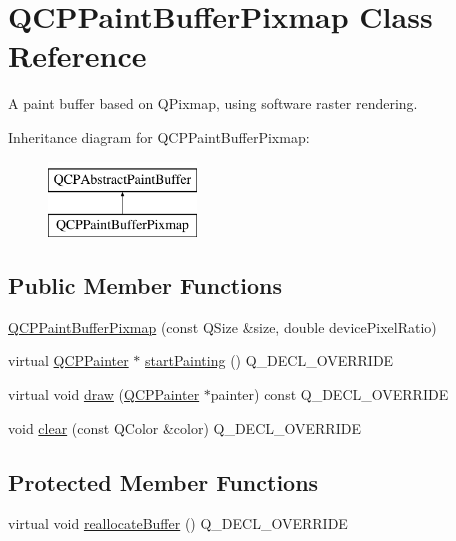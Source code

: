 \hypertarget{class_q_c_p_paint_buffer_pixmap}{}\section{Q\+C\+P\+Paint\+Buffer\+Pixmap Class Reference}
\label{class_q_c_p_paint_buffer_pixmap}


A paint buffer based on Q\+Pixmap, using software raster rendering.  


Inheritance diagram for Q\+C\+P\+Paint\+Buffer\+Pixmap\+:\begin{figure}[H]
\begin{center}
\leavevmode
\includegraphics[height=2.000000cm]{class_q_c_p_paint_buffer_pixmap}
\end{center}
\end{figure}
\subsection*{Public Member Functions}
\begin{DoxyCompactItemize}
\item 
\mbox{\hyperlink{class_q_c_p_paint_buffer_pixmap_aef0224e03b9285509391fcd61a8e6844}{Q\+C\+P\+Paint\+Buffer\+Pixmap}} (const Q\+Size \&size, double device\+Pixel\+Ratio)
\item 
virtual \mbox{\hyperlink{class_q_c_p_painter}{Q\+C\+P\+Painter}} $\ast$ \mbox{\hyperlink{class_q_c_p_paint_buffer_pixmap_a357964ef7d28cfa530338be4e5c93234}{start\+Painting}} () Q\+\_\+\+D\+E\+C\+L\+\_\+\+O\+V\+E\+R\+R\+I\+DE
\item 
virtual void \mbox{\hyperlink{class_q_c_p_paint_buffer_pixmap_af7bfc685e56a0a9329e57cd9a265eb74}{draw}} (\mbox{\hyperlink{class_q_c_p_painter}{Q\+C\+P\+Painter}} $\ast$painter) const Q\+\_\+\+D\+E\+C\+L\+\_\+\+O\+V\+E\+R\+R\+I\+DE
\item 
void \mbox{\hyperlink{class_q_c_p_paint_buffer_pixmap_a14badbd010a3cde6b55817ccb7b65217}{clear}} (const Q\+Color \&color) Q\+\_\+\+D\+E\+C\+L\+\_\+\+O\+V\+E\+R\+R\+I\+DE
\end{DoxyCompactItemize}
\subsection*{Protected Member Functions}
\begin{DoxyCompactItemize}
\item 
virtual void \mbox{\hyperlink{class_q_c_p_paint_buffer_pixmap_ad49f3205ba3463b1c44f8db3cfcc90f0}{reallocate\+Buffer}} () Q\+\_\+\+D\+E\+C\+L\+\_\+\+O\+V\+E\+R\+R\+I\+DE
\end{DoxyCompactItemize}
